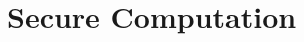 \documentclass[12pt]{tufte-book}
\newcommand{\Enc}{\mathsf{Enc}}
\newcommand{\Dec}{\mathsf{Dec}}
\providecommand{\DIFaddbegin}{} %
\providecommand{\DIFaddend}{} %
\newcommand{\DIFaddincludegraphics}[2][]{{\color{blue}\fbox{\DIFOincludegraphics[#1]{#2}}}} %
\DeclareRobustCommand{\DIFaddbegin}{\DIFOaddbegin \let\includegraphics\DIFaddincludegraphics} %
\DeclareRobustCommand{\DIFaddend}{\DIFOaddend \let\includegraphics\DIFOincludegraphics} %
\begin{document}
\newcommand{\inp}{\mathsf{in}}
\newcommand{\outp}{\mathsf{out}}

\newcommand{\Param}{\kappa}
\newcommand{\Adv}{\mathsf{Adv}}
\newcommand{\Supp}{\mathsf{Supp}}


\newcommand{\PRG}{\mathsf{G}}
\renewcommand{\Enc}{\mathsf{Enc}}
\renewcommand{\Dec}{\mathsf{Dec}}
\renewcommand{\sk}{\mathsf{sk}}
\newcommand{\sfC}{\mathsf{C}}
\newcommand{\sfR}{\mathsf{R}}

\newcommand{\eqdef}{\stackrel{\text{\tiny def}}{=}}

\newcommand{\cF}{\mathcal{F}}

\newcommand{\angles}[1]{\langle #1 \rangle}
\newcommand{\iprod}[1]{\angles{#1}}

\newcommand{\Com}{\mathsf{Com}}


\newcommand{\RealAdv}{\mathcal{A}}
\newcommand{\IdealAdv}{\mathcal{S}}
\newcommand{\RealVar}{\mathsf{Real}}
\newcommand{\IdealVar}{\mathsf{Ideal}}

\DIFaddbegin \newcommand{\RealView}[2]{\mathsf{Real}^{#1}_{#2}}
\newcommand{\IdealView}[2]{\mathsf{Ideal}^{#1}_{#2}}

\DIFaddend \newcommand{\PartyA}{P_1}
\newcommand{\PartyB}{P_2}
\newcommand{\InputA}{x_1}
\newcommand{\InputB}{x_2}


\newcommand{\Garble}{\mathsf{Garble}}
\newcommand{\Cir}{C}
\newcommand{\GCir}{\widetilde{C}}
\newcommand{\Lab}{\mathsf{lab}}

\newcommand{\Sim}{\mathsf{Sim}}



\newcommand{\out}{\mathsf{out}}
\newcommand{\Assign}{:=}

\chapter{Secure Computation}
\end{document}
